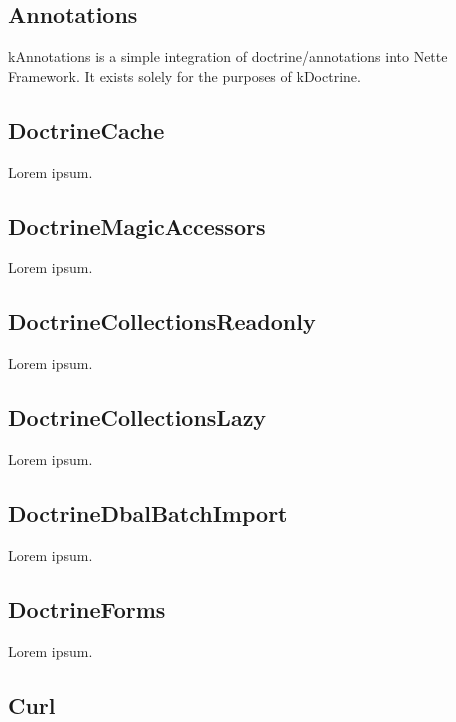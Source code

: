\subsection{Annotations} \label{sec:state:annotations}

\gls{kAnnotations} is a simple integration of doctrine/annotations into Nette Framework. It exists solely for the purposes of \gls{kDoctrine}.

\subsection{DoctrineCache} \label{sec:state:doctrine-cache}

Lorem ipsum.

\subsection{DoctrineMagicAccessors} \label{sec:state:doctrine-magic-accessors}

Lorem ipsum.

\subsection{DoctrineCollectionsReadonly} \label{sec:state:doctrine-collections-readonly}

Lorem ipsum.

\subsection{DoctrineCollectionsLazy} \label{sec:state:doctrine-collections-lazy}

Lorem ipsum.

\subsection{DoctrineDbalBatchImport} \label{sec:state:doctrine-dbal-batch-import}

Lorem ipsum.

\subsection{DoctrineForms} \label{sec:state:doctrine-forms}

Lorem ipsum.

\subsection{Curl} \label{sec:state:curl}

